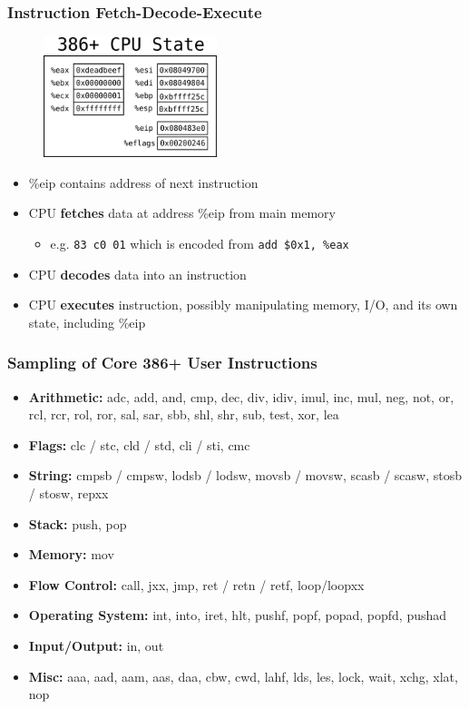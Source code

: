 \documentclass[11pt,xcolor=dvipsnames]{beamer}
\newcommand{\mvs}{\vspace{-0.95em}}
\begin{document}
\begin{frame}[fragile,t]
\frametitle{Instruction Fetch-Decode-Execute}
\mvs
\begin{figure}
\centering \includegraphics[width=0.45\textwidth]{figures/cpustate.png}
\end{figure}
\begin{itemize}
    \item {\ttfamily \%eip} contains address of next instruction
    \item CPU {\bf fetches} data at address {\ttfamily \%eip} from main memory
    \begin{itemize}
        \item e.g. \verb+83 c0 01+ which is encoded from \verb+add $0x1, %eax+
    \end{itemize}
    \item CPU {\bf decodes} data into an instruction
    \item CPU {\bf executes} instruction, possibly manipulating memory, I/O, and its own state, including {\ttfamily \%eip}
\end{itemize}
\end{frame}

\begin{frame}[fragile,t]
\frametitle{Sampling of Core 386+ User Instructions}
\begin{itemize}
    \item {\bf Arithmetic:} {\ttfamily adc, add, and, cmp, dec, div, idiv, imul, inc, mul, neg, not, or, rcl, rcr, rol, ror, sal, sar, sbb, shl, shr, sub, test, xor, lea}
    \item {\bf Flags:} {\ttfamily clc / stc, cld / std, cli / sti, cmc}
    \item {\bf String:} {\ttfamily cmpsb / cmpsw, lodsb / lodsw, movsb / movsw, scasb / scasw, stosb / stosw, repxx}
    \item {\bf Stack:} {\ttfamily push, pop}
    \item {\bf Memory:} {\ttfamily mov}
    \item {\bf Flow Control:} {\ttfamily call, jxx, jmp, ret / retn / retf, loop/loopxx}
    \item {\bf Operating System:} {\ttfamily int, into, iret, hlt, pushf, popf, popad, popfd, pushad}
    \item {\bf Input/Output:} {\ttfamily in, out}
    \item {\bf Misc:} {\ttfamily aaa, aad, aam, aas, daa, cbw, cwd, lahf, lds, les, lock, wait, xchg, xlat, nop}
\end{itemize}
\end{frame}
\end{document}
